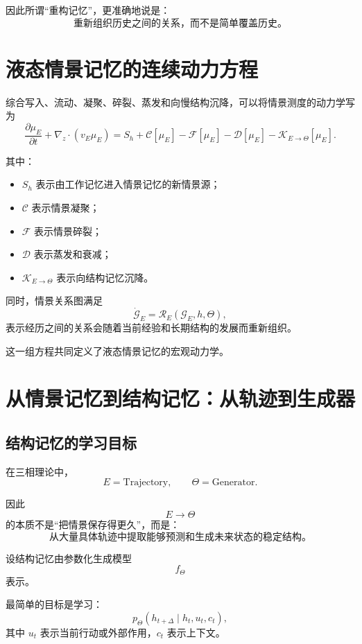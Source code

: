 因此所谓“重构记忆”，更准确地说是：
\[
\boxed{
\text{重新组织历史之间的关系，而不是简单覆盖历史。}
}
\]

\section{液态情景记忆的连续动力方程}

综合写入、流动、凝聚、碎裂、蒸发和向慢结构沉降，可以将情景测度的动力学写为
\[
\boxed{
\frac{\partial \mu_E}{\partial t}
+
\nabla_z
\cdot
\left(
v_E\mu_E
\right)
=
S_h
+
\mathcal{C}[\mu_E]
-
\mathcal{F}[\mu_E]
-
\mathcal{D}[\mu_E]
-
\mathcal{K}_{E\rightarrow\Theta}[\mu_E].
}
\]

其中：

\begin{itemize}
    \item $S_h$ 表示由工作记忆进入情景记忆的新情景源；
    \item $\mathcal{C}$ 表示情景凝聚；
    \item $\mathcal{F}$ 表示情景碎裂；
    \item $\mathcal{D}$ 表示蒸发和衰减；
    \item $\mathcal{K}_{E\rightarrow\Theta}$ 表示向结构记忆沉降。
\end{itemize}

同时，情景关系图满足
\[
\boxed{
\dot{\mathcal{G}}_E
=
\mathcal{R}_E
\left(
\mathcal{G}_E,
h,
\Theta
\right),
}
\]
表示经历之间的关系会随着当前经验和长期结构的发展而重新组织。

这一组方程共同定义了液态情景记忆的宏观动力学。

\section{从情景记忆到结构记忆：从轨迹到生成器}

\subsection{结构记忆的学习目标}

在三相理论中，
\[
E=\mathrm{Trajectory},
\qquad
\Theta=\mathrm{Generator}.
\]

因此
\[
E\rightarrow\Theta
\]
的本质不是“把情景保存得更久”，而是：
\[
\boxed{
\text{从大量具体轨迹中提取能够预测和生成未来状态的稳定结构。}
}
\]

设结构记忆由参数化生成模型
\[
f_\Theta
\]
表示。

最简单的目标是学习：
\[
\boxed{
p_\Theta
\left(
h_{t+\Delta}
\mid
h_t,u_t,c_t
\right),
}
\]
其中 $u_t$ 表示当前行动或外部作用，$c_t$ 表示上下文。

